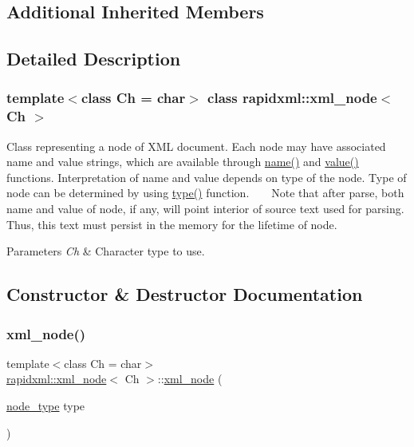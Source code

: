 \subsection*{Additional Inherited Members}


\subsection{Detailed Description}
\subsubsection*{template$<$class Ch = char$>$\newline
class rapidxml\+::xml\+\_\+node$<$ Ch $>$}

Class representing a node of X\+ML document. Each node may have associated name and value strings, which are available through \hyperlink{classrapidxml_1_1xml__base_aef8ae147fbee59209f714274afc80dc4}{name()} and \hyperlink{classrapidxml_1_1xml__base_a6af65de5e59ac497cd69838f8a89d602}{value()} functions. Interpretation of name and value depends on type of the node. Type of node can be determined by using \hyperlink{classrapidxml_1_1xml__node_a5f91729128856b0aaab598d4364ace60}{type()} function. ~\newline
~\newline
 Note that after parse, both name and value of node, if any, will point interior of source text used for parsing. Thus, this text must persist in the memory for the lifetime of node. 
\begin{DoxyParams}{Parameters}
{\em Ch} & Character type to use. \\
\hline
\end{DoxyParams}


\subsection{Constructor \& Destructor Documentation}
\mbox{\label{classrapidxml_1_1xml__node_a8bd9019960b90605a45998b661fb1b0e}} 
\subsubsection{\texorpdfstring{xml\+\_\+node()}{xml\_node()}}
{\footnotesize\ttfamily template$<$class Ch = char$>$ \\
\hyperlink{classrapidxml_1_1xml__node}{rapidxml\+::xml\+\_\+node}$<$ Ch $>$\+::\hyperlink{classrapidxml_1_1xml__node}{xml\+\_\+node} (\begin{DoxyParamCaption}\item[{\hyperlink{rapidxml_8hpp_abb456db38f7efb746c4330eed6072a7c}{node\+\_\+type}}]{type }\end{DoxyParamCaption})\hspace{0.3cm}{\ttfamily [inline]}}

